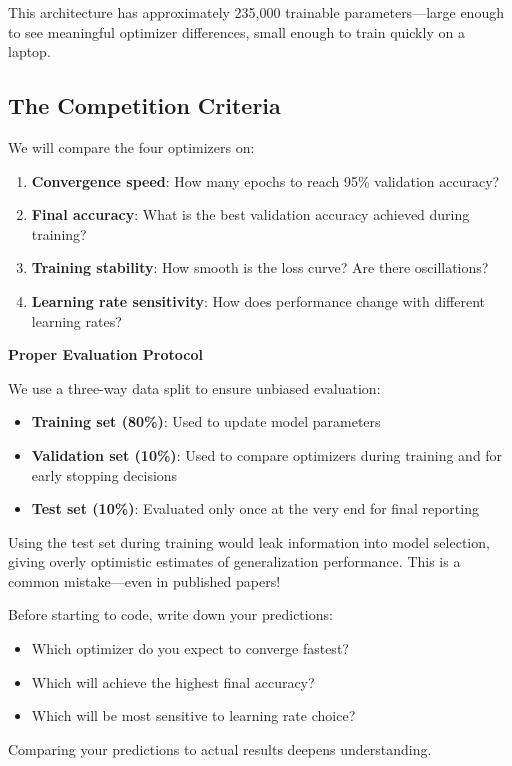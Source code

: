 \documentclass[../../main.tex]{subfiles}
\begin{document}
This architecture has approximately 235,000 trainable parameters---large enough to see meaningful optimizer differences, small enough to train quickly on a laptop.

\subsection{The Competition Criteria}

We will compare the four optimizers on:

\begin{enumerate}
    \item \textbf{Convergence speed}: How many epochs to reach 95\% validation accuracy?
    \item \textbf{Final accuracy}: What is the best validation accuracy achieved during training?
    \item \textbf{Training stability}: How smooth is the loss curve? Are there oscillations?
    \item \textbf{Learning rate sensitivity}: How does performance change with different learning rates?
\end{enumerate}

\begin{important}
\textbf{Proper Evaluation Protocol}

We use a three-way data split to ensure unbiased evaluation:
\begin{itemize}
    \item \textbf{Training set (80\%)}: Used to update model parameters
    \item \textbf{Validation set (10\%)}: Used to compare optimizers during training and for early stopping decisions
    \item \textbf{Test set (10\%)}: Evaluated only once at the very end for final reporting
\end{itemize}

Using the test set during training would leak information into model selection, giving overly optimistic estimates of generalization performance. This is a common mistake---even in published papers!
\end{important}

\begin{keyconcept}
Before starting to code, write down your predictions:
\begin{itemize}
    \item Which optimizer do you expect to converge fastest?
    \item Which will achieve the highest final accuracy?
    \item Which will be most sensitive to learning rate choice?
\end{itemize}
Comparing your predictions to actual results deepens understanding.
\end{keyconcept}
\end{document}

